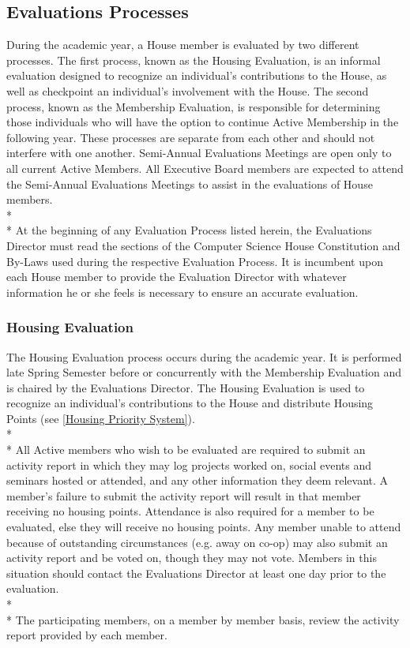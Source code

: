 \documentclass{article}
\newcommand{\bsection}[1]{\subsection{#1} \label{#1}}
\newcommand{\bsubsection}[1]{\subsubsection{#1} \label{#1}}
\begin{document}
\bsection{Evaluations Processes}
During the academic year, a House member is evaluated by two different processes.
The first process, known as the Housing Evaluation, is an informal evaluation designed to recognize an individual's contributions to the House, as well as checkpoint an individual's involvement with the House.
The second process, known as the Membership Evaluation, is responsible for determining those individuals who will have the option to continue Active Membership in the following year.
These processes are separate from each other and should not interfere with one another.
Semi-Annual Evaluations Meetings are open only to all current Active Members.
All Executive Board members are expected to attend the Semi-Annual Evaluations Meetings to assist in the evaluations of House members.
\\* \\*
At the beginning of any Evaluation Process listed herein, the Evaluations Director must read the sections of the Computer Science House Constitution and By-Laws used during the respective Evaluation Process.
It is incumbent upon each House member to provide the Evaluation Director with whatever information he or she feels is necessary to ensure an accurate evaluation.
\bsubsection{Housing Evaluation}
The Housing Evaluation process occurs during the academic year.
It is performed late Spring Semester before or concurrently with the Membership Evaluation and is chaired by the Evaluations Director.
The Housing Evaluation is used to recognize an individual’s contributions to the House and distribute Housing Points (see \ref{Housing Priority System}).
\\* \\*
All Active members who wish to be evaluated are required to submit an activity report in which they may log projects worked on, social events and seminars hosted or attended, and any other information they deem relevant.
A member’s failure to submit the activity report will result in that member receiving no housing points.
Attendance is also required for a member to be evaluated, else they will receive no housing points.
Any member unable to attend because of outstanding circumstances (e.g. away on co-op) may also submit an activity report and be voted on, though they may not vote.
Members in this situation should contact the Evaluations Director at least one day prior to the evaluation.
\\* \\*
The participating members, on a member by member basis, review the activity report provided by each member.
\end{document}

